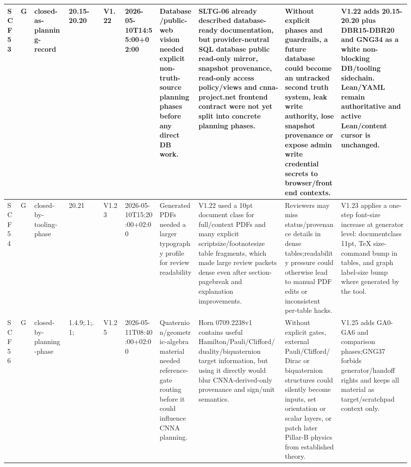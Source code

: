 \begin{longtable}{L{0.03\linewidth} L{0.026\linewidth} L{0.087\linewidth} L{0.085\linewidth} L{0.052\linewidth} L{0.085\linewidth} L{0.095\linewidth} L{0.205\linewidth} L{0.13\linewidth} L{0.165\linewidth}}
\hline
\addlinespace[0.24em]
SCF53 & G & closed-as-planning-record & 20.15-20.20 & V1.22 & 2026-05-10T14:55:00+02:00 & Database/\allowbreak{}public-web vision needed explicit non-truth-source planning phases before any direct DB work. & SLTG-06 already described database-ready documentation, but provider-neutral SQL database public read-only mirror, snapshot provenance, read-only access policy/\allowbreak{}views and cnna-project.net frontend contract were not yet split into concrete planning phases. & Without explicit phases and guardrails, a future database could become an untracked second truth system, leak write authority, lose snapshot provenance or expose admin write credential secrets to browser/\allowbreak{}frontend contexts. & V1.22 adds 20.15-20.20 plus DBR15-DBR20 and GNG34 as a white non-blocking DB/\allowbreak{}tooling sidechain. Lean/\allowbreak{}YAML remain authoritative and active Lean/\allowbreak{}content cursor is unchanged.\\
\hline
\addlinespace[0.24em]
SCF54 & G & closed-by-tooling-phase & 20.21 & V1.23 & 2026-05-10T15:20:00+02:00 & Generated PDFs needed a larger typography profile for review readability & V1.22 used a 10pt document class for full/\allowbreak{}context PDFs and many explicit scriptsize/\allowbreak{}footnotesize table fragments, which made large review packets dense even after section-pagebreak and explanation improvements. & Reviewers may miss status/\allowbreak{}provenance details in dense tables;\newline readability pressure could otherwise lead to manual PDF edits or inconsistent per-table hacks. & V1.23 applies a one-step font-size increase at generator level: documentclass 11pt, TeX size-command bump in tables, and graph label-size bump where generated by the tool.\\
\hline
\addlinespace[0.24em]
SCF56 & G & closed-by-planning-phase & 1.4.9;.1;.1; & V1.25 & 2026-05-11T08:40:00+02:00 & Quaternion/\allowbreak{}geometric-algebra material needed reference-gate routing before it could influence CNNA planning. & Horn 0709.2238v1 contains useful Hamilton/\allowbreak{}Pauli/\allowbreak{}Clifford/\allowbreak{}duality/\allowbreak{}biquaternion target information, but using it directly would blur CNNA-derived-only provenance and sign/\allowbreak{}unit semantics. & Without explicit gates, external Pauli/\allowbreak{}Clifford/\allowbreak{}Dirac or biquaternion structures could silently become inputs, set orientation or scalar layers, or patch later Pillar-B physics from established theory. & V1.25 adds GA0-GA6 and comparison phases;\newline GNG37 forbids generator/\allowbreak{}handoff rights and keeps all material as target/\allowbreak{}scratchpad context only.\\

\end{longtable}
